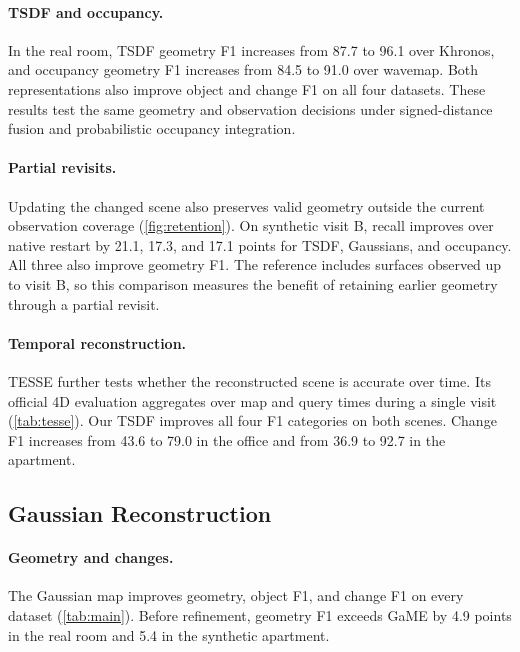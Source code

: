 \paragraph{TSDF and occupancy.}
In the real room, TSDF geometry F1 increases from 87.7 to 96.1 over Khronos, and occupancy geometry F1
increases from 84.5 to 91.0 over wavemap. Both representations also improve object and change F1 on all
four datasets. These results test the same geometry and observation decisions under signed-distance
fusion and probabilistic occupancy integration.





\paragraph{Partial revisits.}
Updating the changed scene also preserves valid geometry outside the current observation coverage
(\cref{fig:retention}). On synthetic visit B,
recall improves over native restart by 21.1, 17.3, and 17.1 points for TSDF, Gaussians, and occupancy.
All three also improve geometry F1. The reference includes surfaces observed up to visit B, so this
comparison measures the benefit of retaining earlier geometry through a partial revisit.





\paragraph{Temporal reconstruction.}
TESSE further tests whether the reconstructed scene is accurate over time. Its official 4D evaluation
aggregates over map and query times during a single visit
(\cref{tab:tesse}). Our TSDF improves all four F1 categories on both scenes. Change F1 increases from
43.6 to 79.0 in the office and from 36.9 to 92.7 in the apartment.

\subsection{Gaussian Reconstruction}
\label{sec:exp_gaussians}

\paragraph{Geometry and changes.}
The Gaussian map improves geometry, object F1, and change F1 on every dataset (\cref{tab:main}).
Before refinement, geometry F1 exceeds GaME by 4.9 points in the real room and 5.4 in the synthetic apartment.

